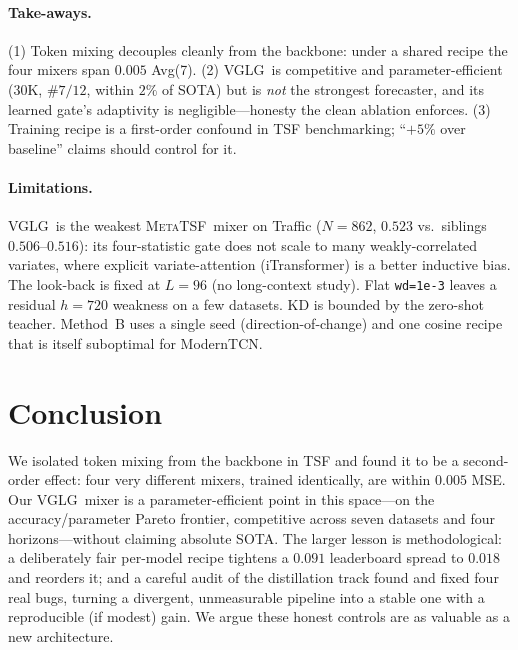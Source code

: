 \documentclass[11pt]{article}
\newcommand{\mtsf}{\textsc{MetaTSF}}
\newcommand{\vglg}{\textsc{VGLG}}
\newcommand{\avgseven}{Avg(7)}
\begin{document}
\paragraph{Take-aways.} (1) Token mixing decouples cleanly from the backbone:
under a shared recipe the four mixers span $0.005$ \avgseven. (2) \vglg\ is
competitive and parameter-efficient ($30$K, $\#7/12$, within $2\%$ of SOTA) but
is \emph{not} the strongest forecaster, and its learned gate's adaptivity is
negligible---honesty the clean ablation enforces. (3) Training recipe is a
first-order confound in TSF benchmarking; ``$+5\%$ over baseline'' claims should
control for it.

\paragraph{Limitations.} \vglg\ is the weakest \mtsf\ mixer on Traffic
($N{=}862$, $0.523$ vs.\ siblings $0.506$--$0.516$): its four-statistic gate does
not scale to many weakly-correlated variates, where explicit variate-attention
(iTransformer) is a better inductive bias. The look-back is fixed at $L{=}96$ (no
long-context study). Flat \texttt{wd=1e-3} leaves a residual $h{=}720$ weakness on
a few datasets. KD is bounded by the zero-shot teacher. Method~B uses a single
seed (direction-of-change) and one cosine recipe that is itself suboptimal for
ModernTCN.

\section{Conclusion}

We isolated token mixing from the backbone in TSF and found it to be a
second-order effect: four very different mixers, trained identically, are within
$0.005$ MSE. Our \vglg\ mixer is a parameter-efficient point in this space---on the
accuracy/parameter Pareto frontier, competitive across seven datasets and four
horizons---without claiming absolute SOTA. The larger lesson is methodological: a
deliberately fair per-model recipe tightens a $0.091$ leaderboard spread to $0.018$
and reorders it; and a careful audit of the distillation track found and fixed four
real bugs, turning a divergent, unmeasurable pipeline into a stable one with a
reproducible (if modest) gain. We argue these honest controls are as valuable as a
new architecture.
\end{document}
